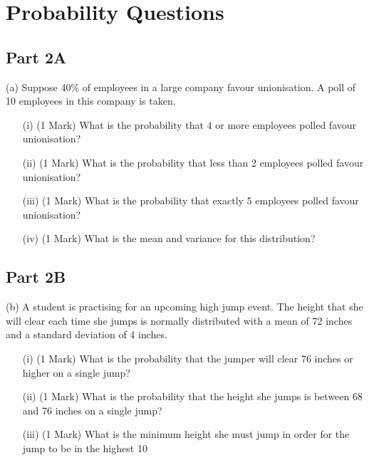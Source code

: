 \documentclass[]{article}
\begin{document}
\section{Probability Questions}
\subsection*{Part 2A}

(a)	Suppose 40\% of employees in a large company favour unionisation.  A poll of 10 employees in this company is taken.  
 \begin{itemize}
\item[(i)] (1 Mark) 	What is the probability that 4 or more employees polled favour unionisation? 
\item[(ii)] (1 Mark) 	What is the probability that less than 2 employees polled favour unionisation?
\item[(iii)] (1 Mark) 	What is the probability that exactly 5 employees polled favour unionisation?
\item[(iv)] (1 Mark) 	What is the mean and variance for this distribution?
\end{itemize}										       

\subsection*{Part 2B}
(b)	A student is practising for an upcoming high jump event.  The height that she will clear each time she jumps is normally distributed with a 
mean of 72 inches and a standard deviation of 4 inches.  
\begin{itemize}
\item[(i)] (1 Mark) 	What is the probability that the jumper will clear 76 inches or higher on a single jump?
\item[(ii)] (1 Mark) 	What is the probability that the height she jumps is between 68 and 76 inches on a single jump?
\item[(iii)] (1 Mark) 	What is the minimum height she must jump in order for the jump to be in the highest 10%
\end{itemize}
    

\end{document}
